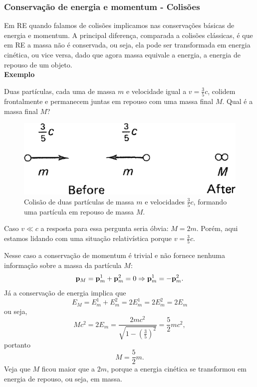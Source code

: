 \documentclass[12pt,a4paper,titlepage,brazil]{article}
\begin{document}
\subsubsection{Conservação de energia e momentum - Colisões}

Em RE quando falamos de colisões implicamos nas conservações básicas de energia e momentum. A principal diferença, comparada a colisões clássicas, é que em RE a massa não é conservada, ou seja, ela pode ser transformada em energia cinética, ou vice versa, dado que agora massa equivale a energia, a energia de repouso de um objeto.\\

\textbf{Exemplo}

Duas partículas, cada uma de massa $m$ e velocidade igual a $v = \frac{3}{5} c$, colidem frontalmente e permanecem juntas em repouso com uma massa final $M$. Qual é a massa final $M$?

\begin{figure}[h!]
 \centering 
 \includegraphics[scale=0.5]{figuras/ex1.png}
 \caption{Colisão de duas partículas de massa $m$ e velocidades $\frac{3}{5} c$, formando uma partícula em repouso de massa $M$.}
\end{figure}

Caso $v \ll c$ a resposta para essa pergunta seria óbvia: $M = 2 m$. Porém, aqui estamos lidando com uma situação relativística porque $v = \frac{3}{5} c$.

Nesse caso a conservação de momentum é trivial e não fornece nenhuma informação sobre a massa da partícula $M$:
\begin{equation}
 {\bf p}_M = {\bf p}_m^1 + {\bf p}_m^2 = 0 \Rightarrow {\bf p}_m^1 = - {\bf p}_m^2 .
\end{equation}
Já a conservação de energia implica que
\begin{equation}
 E_M = E_m^1 + E_m^2 = 2 E_m^1 = 2 E_m^2 = 2 E_m
\end{equation}
ou seja,
\begin{equation}
 M c^2 = 2 E_m = \frac{2 m c^2}{\sqrt{1 - \left(\frac{3}{5}\right)^2}} = \frac{5}{2} m c^2 ,
\end{equation}
portanto
\begin{equation}
 M = \frac{5}{2} m .
\end{equation}  
Veja que $M$ ficou maior que a $2 m$, porque a energia cinética se transformou em energia de repouso, ou seja, em massa.
\end{document}
